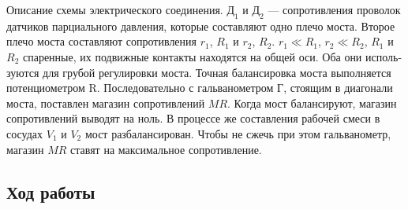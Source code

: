 \documentclass[12pt,a4paper]{article}
\begin{document}
Описание схемы электрического соединения. $Д_1$ и $Д_2$ — сопротивления проволок датчиков парциального давления, которые составляют одно плечо моста. Второе плечо моста составляют сопротивления $r_1$, $R_1$ и $r_2$, $R_2$. $r_1 \ll R_1$, $r_2 \ll R_2$, $R_1$ и $R_2$ спаренные, их подвижные контакты находятся на общей оси. Оба они исполь- зуются для грубой регулировки моста. Точная балансировка моста выполняется потенциометром R. Последовательно с гальванометром $Г$, стоящим в диагонали моста, поставлен магазин сопротивлений $MR$. Когда мост балансируют, магазин сопротивлений выводят на ноль. В процессе же составления рабочей смеси в сосудах $V_1$ и $V_2$ мост разбалансирован. Чтобы не сжечь при этом гальванометр, магазин $MR$ ставят на максимальное сопротивление.

\subsection*{Ход работы}
\end{document}
